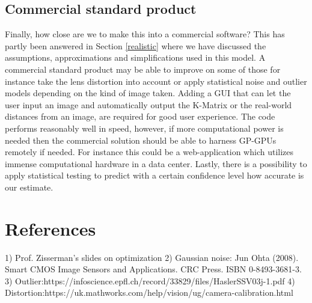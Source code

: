 \documentclass[titlepage]{article}
\begin{document}
\subsection{Commercial standard product}
Finally, how close are we to make this into a commercial software? This has partly been answered in Section \ref{realistic} where we have discussed the assumptions, approximations and simplifications used in this model. A commercial standard product may be able to improve on some of those for instance take the lens distortion into account or apply statistical noise and outlier models depending on the kind of image taken. Adding a GUI that can let the user input an image and automatically output the K-Matrix or the real-world distances from an image, are required for good user experience. The code performs reasonably well in speed, however, if more computational power is needed then the commercial solution should be able to harness GP-GPUs remotely if needed. For instance this could be a web-application which utilizes immense computational hardware in a data center. Lastly, there is a possibility to apply statistical testing to predict with a certain confidence level how accurate is our estimate.

\section{References}
1) Prof. Zisserman's slides on optimization
2) Gaussian noise: Jun Ohta (2008). Smart CMOS Image Sensors and Applications. CRC Press. ISBN 0-8493-3681-3.
3) Outlier:https://infoscience.epfl.ch/record/33829/files/HaslerSSV03j-1.pdf
4) Distortion:https://uk.mathworks.com/help/vision/ug/camera-calibration.html
\end{document}
